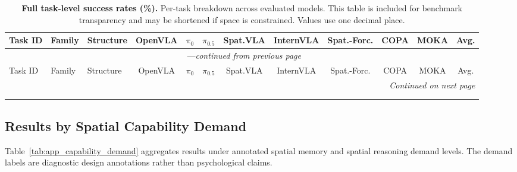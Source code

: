\begin{landscape}
\small
\begin{longtable}{p{2.2cm} p{1.5cm} p{1.8cm} c c c c c c c c c}
  \caption{\textbf{Full task-level success rates (\%).} Per-task breakdown across evaluated models. This table is included for benchmark transparency and may be shortened if space is constrained. Values use one decimal place.}
  \label{tab:app_task_full}\\
  \toprule
  \rowcolor{HeaderGray}
  Task ID & Family & Structure & OpenVLA & $\pi_0$ & $\pi_{0.5}$ & Spat.VLA & InternVLA & Spat.-Forc. & COPA & MOKA & Avg. \\
  \midrule
  \endfirsthead
  \multicolumn{12}{c}{{\tablename\ \thetable{}---\textit{continued from previous page}}} \\
  \toprule
  \rowcolor{HeaderGray}
  Task ID & Family & Structure & OpenVLA & $\pi_0$ & $\pi_{0.5}$ & Spat.VLA & InternVLA & Spat.-Forc. & COPA & MOKA & Avg. \\
  \midrule
  \endhead
  \midrule
  \multicolumn{12}{r}{\textit{Continued on next page}} \\
  \endfoot
  \bottomrule
  \endlastfoot
  \TODO{} & \TODO{} & \TODO{} & \TODO{} & \TODO{} & \TODO{} & \TODO{} & \TODO{} & \TODO{} & \TODO{} & \TODO{} & \textbf{\TODO{}} \\
  \TODO{} & \TODO{} & \TODO{} & \TODO{} & \TODO{} & \TODO{} & \TODO{} & \TODO{} & \TODO{} & \TODO{} & \TODO{} & \textbf{\TODO{}} \\
\end{longtable}
\end{landscape}

\subsection{Results by Spatial Capability Demand}
\label{app:subsec:capdemand}

Table~\ref{tab:app_capability_demand} aggregates results under annotated spatial memory and spatial reasoning demand levels. The demand labels are diagnostic design annotations rather than psychological claims.

